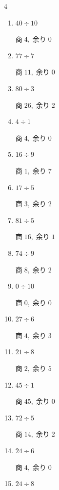 \begin{multicols}{4}
\begin{enumerate}
  \item $40 \div 10$

        $商\; 4,\; 余り\; 0$

  \item $77 \div 7$

        $商\; 11,\; 余り\; 0$

  \item $80 \div 3$

        $商\; 26,\; 余り\; 2$

  \item $4 \div 1$

        $商\; 4,\; 余り\; 0$

  \item $16 \div 9$

        $商\; 1,\; 余り\; 7$

  \item $17 \div 5$

        $商\; 3,\; 余り\; 2$

\columnbreak %

\resetques

  \item $81 \div 5$

        $商\; 16,\; 余り\; 1$

  \item $74 \div 9$

        $商\; 8,\; 余り\; 2$

  \item $0 \div 10$

        $商\; 0,\; 余り\; 0$

  \item $27 \div 6$

        $商\; 4,\; 余り\; 3$

  \item $21 \div 8$

        $商\; 2,\; 余り\; 5$

  \item $45 \div 1$

        $商\; 45,\; 余り\; 0$

  \item $72 \div 5$

        $商\; 14,\; 余り\; 2$

  \item $24 \div 6$

        $商\; 4,\; 余り\; 0$

  \item $24 \div 8$


\end{enumerate}
\end{multicols}
